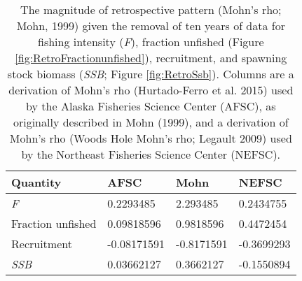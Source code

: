 
\begin{longtable}[t]{llll}
\caption{\label{tab:RetroMohnsrho}The magnitude of retrospective pattern (Mohn's rho; Mohn, 1999) given the removal of ten years of data for fishing intensity (\emph{F}), fraction unfished (Figure \ref{fig:RetroFractionunfished}),  recruitment, and spawning stock biomass (\emph{SSB}; Figure \ref{fig:RetroSsb}). Columns are a derivation of Mohn's rho (Hurtado-Ferro et al. 2015) used by the Alaska Fisheries Science Center (AFSC), as originally described in Mohn (1999), and a derivation of Mohn's rho (Woods Hole Mohn's rho; Legault 2009) used by the Northeast Fisheries Science Center (NEFSC).}\\
\toprule
Quantity & AFSC & Mohn & NEFSC\\
\midrule
\emph{F} & 0.2293485 & 2.293485 & 0.2434755\\
Fraction unfished & 0.09818596 & 0.9818596 & 0.4472454\\
Recruitment & -0.08171591 & -0.8171591 & -0.3699293\\
\emph{SSB} & 0.03662127 & 0.3662127 & -0.1550894\\
\bottomrule
\end{longtable}
